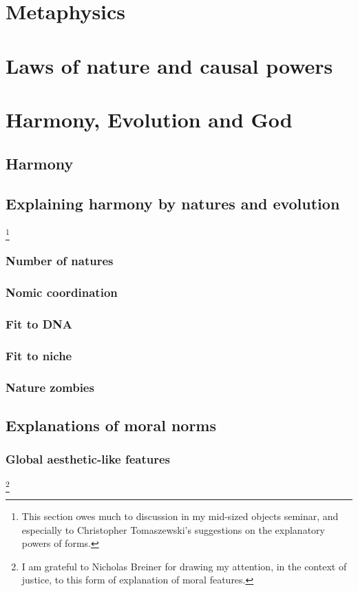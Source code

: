 \chapter{Metaphysics}\label{ch:metaphysics}
\chaptertail 

\def\mychapter{VIII}

\chapter{Laws of nature and causal powers}\label{ch:laws}
\chaptertail

\def\mychapter{IX}

\chapter{Harmony, Evolution and God}\label{ch:God}
\section{Harmony}
\section{Explaining harmony by natures and evolution}
\footnote{This section owes much to discussion in my mid-sized objects seminar, and especially to Christopher Tomaszewski's suggestions on the explanatory powers of forms.}
\subsection{Number of natures}
\subsection{Nomic coordination}
\subsection{Fit to DNA}
\subsection{Fit to niche}
\subsection{Nature zombies}
\section{Explanations of moral norms}
\subsection{Global aesthetic-like features}\footnote{I am grateful to Nicholas Breiner for drawing my attention, in the context of
justice, to this form of explanation of moral features.}
